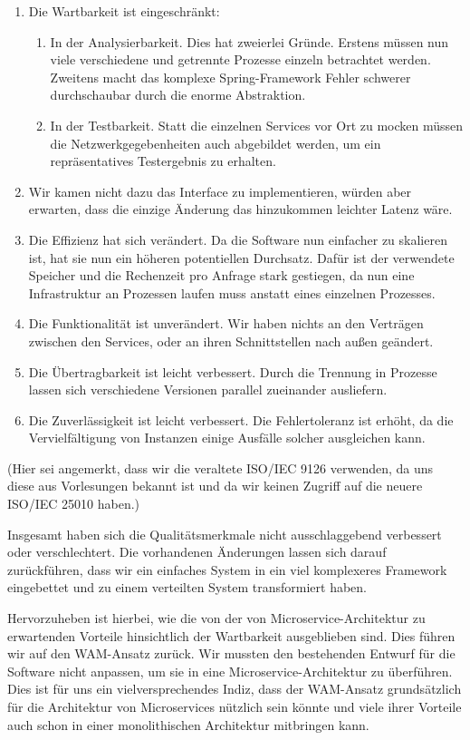 \documentclass{article}
\begin{document}
\begin{enumerate}
	\item Die Wartbarkeit ist eingeschränkt:
		\begin{enumerate}
			\item In der Analysierbarkeit.
			Dies hat zweierlei Gründe.
			Erstens müssen nun viele verschiedene und getrennte Prozesse einzeln betrachtet werden.
			Zweitens macht das komplexe Spring-Framework Fehler schwerer durchschaubar durch die enorme Abstraktion.
			\item In der Testbarkeit. Statt die einzelnen Services vor Ort zu mocken müssen die Netzwerkgegebenheiten auch abgebildet werden, um ein repräsentatives Testergebnis zu erhalten.
	\end{enumerate}
	\item Wir kamen nicht dazu das Interface zu implementieren, würden aber erwarten, dass die einzige Änderung das hinzukommen leichter Latenz wäre.
	\item Die Effizienz hat sich verändert.
	Da die Software nun einfacher zu skalieren ist, hat sie nun ein höheren potentiellen Durchsatz.
	Dafür ist der verwendete Speicher und die Rechenzeit pro Anfrage stark gestiegen, da nun eine Infrastruktur an Prozessen laufen muss anstatt eines einzelnen Prozesses.
	\item Die Funktionalität ist unverändert.
	Wir haben nichts an den Verträgen zwischen den Services, oder an ihren Schnittstellen nach außen geändert.
	\item Die Übertragbarkeit ist leicht verbessert.
	Durch die Trennung in Prozesse lassen sich verschiedene Versionen parallel zueinander ausliefern.
	\item Die Zuverlässigkeit ist leicht verbessert.
	Die Fehlertoleranz ist erhöht, da die Vervielfältigung von Instanzen einige Ausfälle solcher ausgleichen kann.
\end{enumerate}

(Hier sei angemerkt, dass wir die veraltete ISO/IEC 9126 verwenden, da uns diese aus Vorlesungen bekannt ist und da wir keinen Zugriff auf die neuere ISO/IEC 25010 haben.)

Insgesamt haben sich die Qualitätsmerkmale nicht ausschlaggebend verbessert oder verschlechtert.
Die vorhandenen Änderungen lassen sich darauf zurückführen, dass wir ein einfaches System in ein viel komplexeres Framework eingebettet und zu einem verteilten System transformiert haben.

Hervorzuheben ist hierbei, wie die von der von Microservice-Architektur zu erwartenden Vorteile  hinsichtlich der Wartbarkeit ausgeblieben sind.
Dies führen wir auf den WAM-Ansatz zurück.
Wir mussten den bestehenden Entwurf für die Software nicht anpassen, um sie in eine Microservice-Architektur zu überführen.
Dies ist für uns ein vielversprechendes Indiz, dass der WAM-Ansatz grundsätzlich für die Architektur von Microservices nützlich sein könnte und viele ihrer Vorteile auch schon in einer monolithischen Architektur mitbringen kann.
\end{document}
